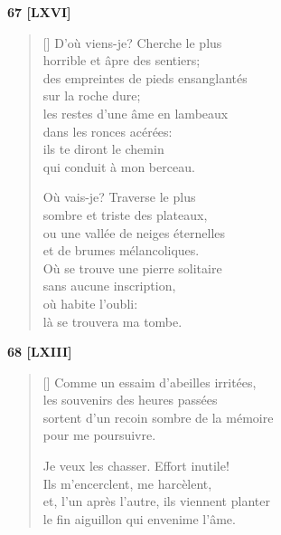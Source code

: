 \documentclass[a4paper,12pt]{book}
\begin{document}
\bigskip

\begin{center}
  \textbf{67 [LXVI]}
\end{center}

\settowidth{\versewidth}{des empreintes de pieds ensanglantés}

\begin{verse}[\versewidth]
  D'où viens-je? Cherche le plus \\
  horrible et âpre des sentiers; \\
  des empreintes de pieds ensanglantés \\
  sur la roche dure; \\
  les restes d'une âme en lambeaux \\
  dans les ronces acérées: \\
  ils te diront le chemin \\
  qui conduit à mon berceau.

  Où vais-je? Traverse le plus \\
  sombre et triste des plateaux, \\
  ou une vallée de neiges éternelles \\
  et de brumes mélancoliques. \\
  Où se trouve une pierre solitaire \\
  sans aucune inscription, \\
  où habite l'oubli: \\
  là se trouvera ma tombe.
\end{verse}

\bigskip

\begin{center}
  \textbf{68 [LXIII]}
\end{center}

\settowidth{\versewidth}{et, l'un après l'autre, ils viennent planter}

\begin{verse}[\versewidth]
  Comme un essaim d'abeilles irritées, \\
  les souvenirs des heures passées \\
  sortent d'un recoin sombre de la mémoire \\
  pour me poursuivre.

  Je veux les chasser. Effort inutile! \\
  Ils m'encerclent, me harcèlent, \\
  et, l'un après l'autre, ils viennent planter \\
  le fin aiguillon qui envenime l'âme.
\end{verse}
\end{document}
